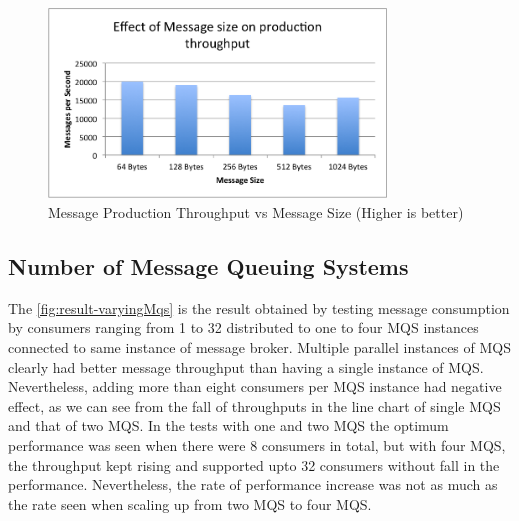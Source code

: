 \begin{figure}[H]
  \centering  \includegraphics[width=0.8\textwidth]{figures/03productionMessageSize}
  \caption[Message Production Throughput vs Message Size]{Message Production Throughput vs Message Size (Higher is better)}
  \label{fig:result-productionMessageSize}
\end{figure}

\subsection{Number of Message Queuing Systems}
  The \autoref{fig:result-varyingMqs} is the result obtained by testing message consumption by consumers ranging from 1 to 32 distributed to one to four MQS instances connected to same instance of message broker. Multiple parallel instances of MQS clearly had better message throughput than having a single instance of MQS. Nevertheless, adding more than eight consumers per MQS instance had negative effect, as we can see from the fall of throughputs in the line chart of single MQS and that of two MQS. In the tests with one and two MQS the optimum performance was seen when there were 8 consumers in total, but with four MQS, the throughput kept rising and supported upto 32 consumers without fall in the performance. Nevertheless, the rate of performance increase was not as much as the rate seen when scaling up from two MQS to four MQS.

